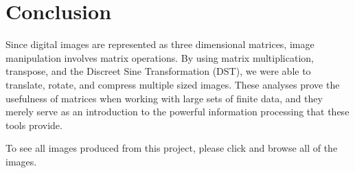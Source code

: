 \section{Conclusion}
Since digital images are represented as three dimensional matrices, image manipulation involves matrix operations. By using matrix multiplication, transpose, and the Discreet Sine Transformation (DST), we were able to translate, rotate, and compress multiple sized images. These analyses prove the usefulness of matrices when working with large sets of finite data, and they merely serve as an introduction to the powerful information processing that these tools provide.

To see all images produced from this project, please click  and browse all of the images.
